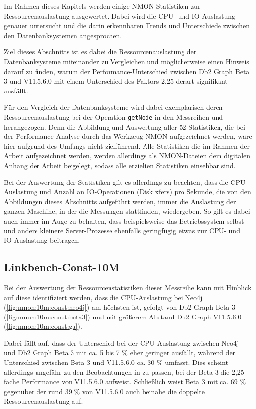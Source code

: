Im Rahmen dieses Kapitels werden einige NMON-Statistiken zur Ressourcenauslastung ausgewertet. Dabei wird die CPU- und IO-Aus\-last\-ung genauer untersucht und die darin erkennbaren Trends und Unterschiede zwischen den Datenbanksystemen angesprochen. 

Ziel dieses Abschnitts ist es dabei die Ressourcenauslastung der Datenbanksysteme miteinander zu Vergleichen und möglicherweise einen Hinweis darauf zu finden, warum der Performance-Unterschied zwischen Db2 Graph Beta 3 und V11.5.6.0 mit einem Unterschied des Faktors 2,25 derart signifikant ausfällt. 

Für den Vergleich der Datenbanksysteme wird dabei exemplarisch deren Ressourcenauslastung bei der Operation \texttt{getNode} in den Messreihen  und  herangezogen. Denn die Abbildung und Auswertung aller 52 Statistiken, die bei der Performance-Analyse durch das Werkzeug NMON aufgezeichnet werden, wäre hier aufgrund des Umfangs nicht zielführend. Alle Statistiken die im Rahmen der Arbeit aufgezeichnet werden, werden allerdings als NMON-Dateien dem digitalen Anhang der Arbeit beigelegt, sodass alle erzielten Statistiken einsehbar sind.

Bei der Auswertung der Statistiken gilt es allerdings zu beachten, dass die CPU-Auslastung und Anzahl an IO-Ope\-ra\-ti\-on\-en (Disk xfers) pro Sekunde, die von den Abbildungen dieses Abschnitts aufgeführt werden, immer die Auslastung der ganzen Maschine, in der die Messungen stattfinden, wiedergeben. So gilt es dabei auch immer im Auge zu behalten, dass beispielsweise das Betriebssystem selbst und andere kleinere Server-Prozesse ebenfalls geringfügig etwas zur CPU- und IO-Aus\-last\-ung beitragen.  

\subsection{Linkbench-Const-10M}
\label{auswertung:ressourcenauslastung:const}
Bei der Auswertung der Ressourcenstatistiken dieser Messreihe kann mit Hinblick auf diese identifiziert werden, dass die CPU-Auslastung bei Neo4j (\autoref{fig:nmon:10m:const:neo4j}) am höchsten ist, gefolgt von Db2 Graph Beta 3 (\autoref{fig:nmon:10m:const:beta3}) und mit größerem Abstand Db2 Graph V11.5.6.0 (\autoref{fig:nmon:10m:const:ga}). 

Dabei fällt auf, dass der Unterschied bei der CPU-Auslastung zwischen Neo4j und Db2 Graph Beta 3 mit ca. 5 bis 7 \% eher geringer ausfällt, während der Unterschied zwischen Beta 3 und V11.5.6.0 ca. 30 \% umfasst. Dies scheint allerdings ungefähr zu den Beobachtungen in  zu passen, bei der Beta 3 die 2,25-fache Performance von V11.5.6.0 aufweist. Schließlich weist Beta 3 mit ca. 69 \% gegenüber der rund 39 \% von V11.5.6.0 auch beinahe die doppelte Ressourcenauslastung auf.

